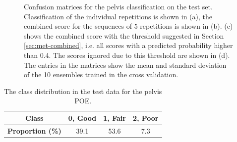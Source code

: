 \begin{figure}[h]
\begin{subfigure}[t]{0.48\textwidth}
      \caption{}
      \label{fig:pelvis-cnf-ignored}
  \end{subfigure}
  \caption{Confusion matrices for the pelvis classification on the test set. Classification of the individual repetitions is shown in (a), the combined score for the sequences of 5 repetitions is shown in (b). (c) shows the combined score with the threshold suggested in Section \ref{sec:met-combined}, i.e. all scores with a predicted probability higher than 0.4. The scores ignored due to this threshold are shown in (d). The entries in the matrices show the mean and standard deviation of the 10 ensembles trained in the cross validation.}
  \label{fig:pelvis-cnfs}
\end{figure}

\begin{table}[h]
  \caption{The class distribution in the test data for the pelvis POE.}
  \label{tab:pelvis-class-dist}
  \centering
  \begin{tabu}[c]{cccc}
    \textbf{Class}            & 0, Good & 1, Fair & 2, Poor \\ \hline \hline
    \textbf{Proportion (\%)}  & 39.1 & 53.6 & 7.3
  \end{tabu}
\end{table}

